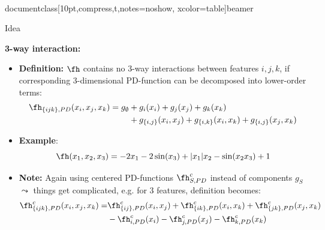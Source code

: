 \\documentclass[10pt,compress,t,notes=noshow, xcolor=table]{beamer}
\begin{document}
\begin{frame}{Idea %
}

\textbf{3-way interaction:}
\begin{itemize}[<+->]
    \item \textbf{Definition:} $\fh$ contains no 3-way interactions between features $ i, j, k $, if corresponding 3-dimensional PD-function can be decomposed into lower-order terms:
    \begin{align*}
        \fh_{\{ijk\}, PD}(x_i, x_j, x_k)
        = g_\emptyset
            &+ g_i(x_i) + g_j(x_j) + g_k(x_k) \\
            &+ g_{\{i,j\}}(x_i, x_j) + g_{\{i,k\}}(x_i, x_k) + g_{\{i,j\}}(x_j, x_k)
    \end{align*}
    \item \textbf{Example}:
    $$
    \fh(x_1, x_2, x_3) = - 2x_1 - 2\sin(x_3) + |x_1|x_2 - \sin(x_2 x_3) + 1
    $$
    \item
    \textbf{Note:} Again using centered PD-functions $\fh^c_{S, PD}$ instead of components $g_S$ \\
    $\leadsto$ things get complicated, e.g. for 3 features, definition becomes:
    \begin{align*}
        \fh^c_{\{ijk\}, PD}(x_i, x_j, x_k)
        = & \fh^c_{\{ij\}, PD}(x_i, x_j) + \fh^c_{\{ik\}, PD}(x_i, x_k) + \fh^c_{\{jk\}, PD}(x_j, x_k) \\
        & - \fh^c_{i, PD}(x_i) - \fh^c_{j, PD}(x_j) - \fh^c_{k, PD}(x_k)
    \end{align*}
\end{itemize}

\end{frame}
\end{document}
